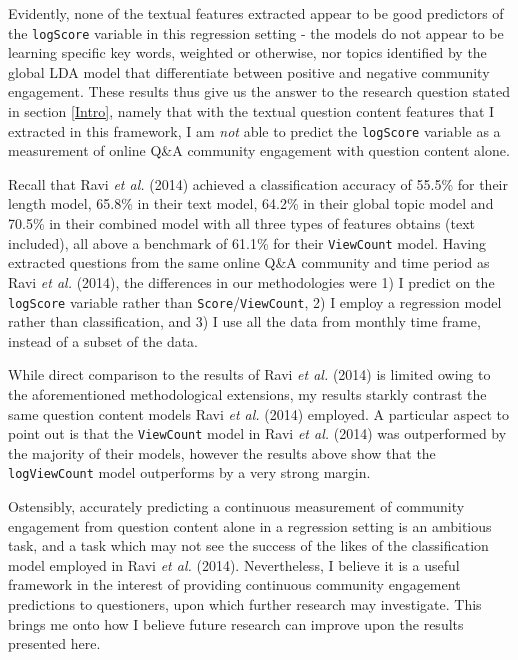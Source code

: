 \documentclass[11pt,preprint, authoryear]{article}
\begin{document}
Evidently, none of the textual features extracted appear to be good
predictors of the \texttt{logScore} variable in this regression setting
- the models do not appear to be learning specific key words, weighted
or otherwise, nor topics identified by the global LDA model that
differentiate between positive and negative community engagement. These
results thus give us the answer to the research question stated in
section \ref{Intro}, namely that with the textual question content
features that I extracted in this framework, I am \emph{not} able to
predict the \texttt{logScore} variable as a measurement of online Q\&A
community engagement with question content alone.

Recall that Ravi \emph{et al.} (2014) achieved a classification accuracy
of 55.5\% for their length model, 65.8\% in their text model, 64.2\% in
their global topic model and 70.5\% in their combined model with all
three types of features obtains (text included), all above a benchmark
of 61.1\% for their \texttt{ViewCount} model. Having extracted questions
from the same online Q\&A community and time period as Ravi \emph{et
al.} (2014), the differences in our methodologies were 1) I predict on
the \texttt{logScore} variable rather than
\texttt{Score}/\texttt{ViewCount}, 2) I employ a regression model rather
than classification, and 3) I use all the data from monthly time frame,
instead of a subset of the data.

While direct comparison to the results of Ravi \emph{et al.} (2014) is
limited owing to the aforementioned methodological extensions, my
results starkly contrast the same question content models Ravi \emph{et
al.} (2014) employed. A particular aspect to point out is that the
\texttt{ViewCount} model in Ravi \emph{et al.} (2014) was outperformed
by the majority of their models, however the results above show that the
\texttt{logViewCount} model outperforms by a very strong margin.

Ostensibly, accurately predicting a continuous measurement of community
engagement from question content alone in a regression setting is an
ambitious task, and a task which may not see the success of the likes of
the classification model employed in Ravi \emph{et al.} (2014).
Nevertheless, I believe it is a useful framework in the interest of
providing continuous community engagement predictions to questioners,
upon which further research may investigate. This brings me onto how I
believe future research can improve upon the results presented here.

\newpage
\end{document}

